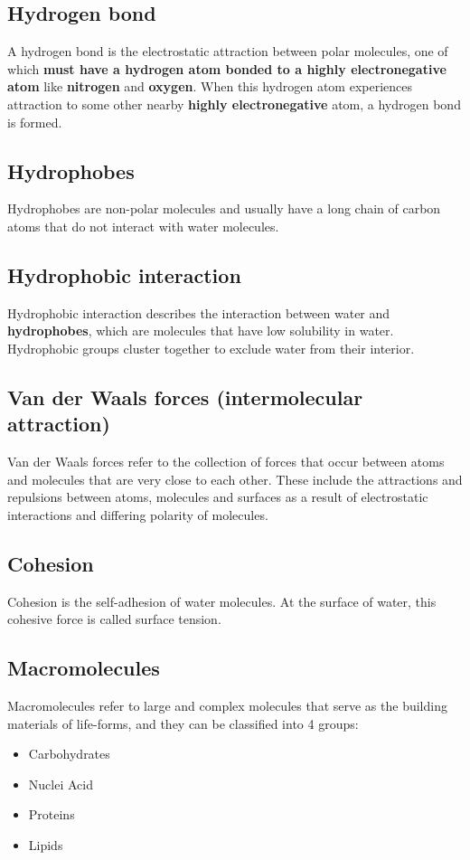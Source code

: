\documentclass[11pt]{article}
\begin{document}
\subsection{Hydrogen bond}
\label{sec:orgf739479}
A hydrogen bond is the electrostatic attraction between polar molecules, one of which \textbf{must have a hydrogen atom bonded to a highly electronegative atom} like \textbf{nitrogen} and \textbf{oxygen}. When this hydrogen atom experiences attraction to some other nearby \textbf{highly electronegative} atom, a hydrogen bond is formed.
\subsection{Hydrophobes}
\label{sec:org844caad}
Hydrophobes are non-polar molecules and usually have a long chain of carbon atoms that do not interact with water molecules.
\subsection{Hydrophobic interaction}
\label{sec:orgc1c0d0f}
Hydrophobic interaction describes the interaction between water and \textbf{hydrophobes}, which are molecules that have low solubility in water. Hydrophobic groups cluster together to exclude water from their interior.
\subsection{Van der Waals forces (intermolecular attraction)}
\label{sec:org6fa5e5b}
Van der Waals forces refer to the collection of forces that occur between atoms and molecules that are very close to each other. These include the attractions and repulsions between atoms, molecules and surfaces as a result of electrostatic interactions and differing polarity of molecules.
\subsection{Cohesion}
\label{sec:orgbef10a6}
Cohesion is the self-adhesion of water molecules. At the surface of water, this cohesive force is called surface tension.
\subsection{Macromolecules}
\label{sec:org2591188}
Macromolecules refer to large and complex molecules that serve as the building materials of life-forms, and they can be classified into 4 groups:
\begin{itemize}
\item Carbohydrates
\item Nuclei Acid
\item Proteins
\item Lipids
\end{itemize}
\end{document}
